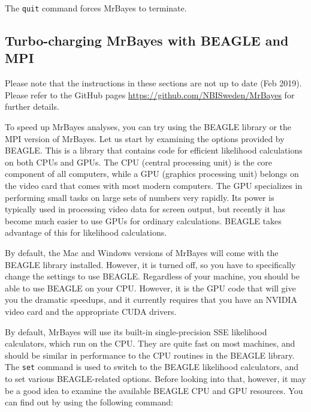 \documentclass[12pt]{book}
\newcommand{\ttt}[1]{\texttt{#1}}
\begin{document}
The \ttt{quit} command forces MrBayes to terminate.


\subsection{Turbo-charging MrBayes with BEAGLE and MPI}

\vspace{5 pt}
{\large Please note that the instructions in these sections are not up to date
(Feb 2019). Please refer to the GitHub pages \url{https://github.com/NBISweden/MrBayes}
for further details.}
\vspace{5 pt}

To speed up MrBayes analyses, you can try using the BEAGLE library or the MPI version of MrBayes.
Let us start by examining the options provided by BEAGLE. This is a library that contains code for
efficient likelihood calculations on both CPUs and GPUs. The CPU (central processing unit) is the
core component of all computers, while a GPU (graphics processing unit) belongs on the video card
that comes with most modern computers. The GPU specializes in performing small tasks on large sets
of numbers very rapidly. Its power is typically used in processing video data for screen output,
but recently it has become much easier to use GPUs for ordinary calculations. BEAGLE takes
advantage of this for likelihood calculations.

By default, the Mac and Windows versions of MrBayes will come with the BEAGLE library installed.
However, it is turned off, so you have to specifically change the settings to use BEAGLE.
Regardless of your machine, you should be able to use BEAGLE on your CPU. However, it is the GPU
code that will give you the dramatic speedups, and it currently requires that you have an NVIDIA
video card and the appropriate CUDA drivers.

By default, MrBayes will use its built-in single-precision SSE likelihood calculators, which run on
the CPU. They are quite fast on most machines, and should be similar in performance to the CPU
routines in the BEAGLE library. The \ttt{set} command is used to switch to the BEAGLE likelihood
calculators, and to set various BEAGLE-related options. Before looking into that, however, it may
be a good idea to examine the available BEAGLE CPU and GPU resources. You can find out by using the
following command:
\end{document}
